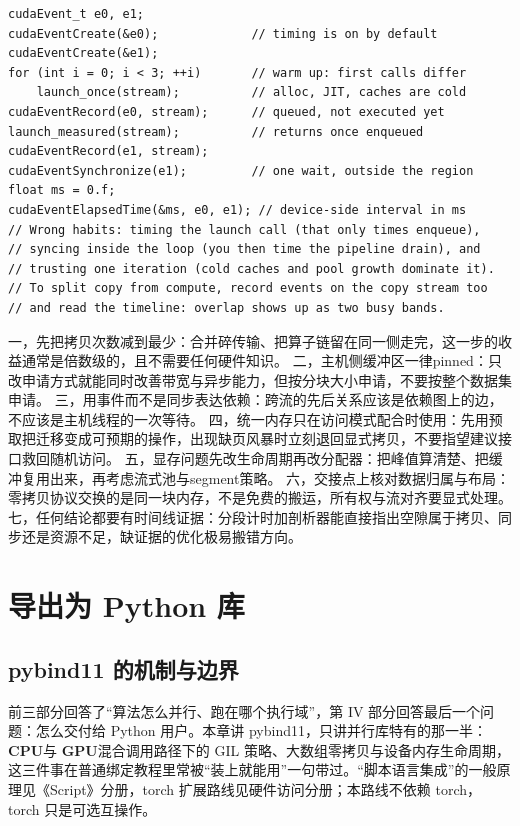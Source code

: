 \documentclass[12pt,a4paper,fontset=fandol]{ctexbook}
\newcommand{\Dom}[1]{\textsf{\bfseries #1}}
\newcommand{\CPU}{\Dom{CPU}}
\newcommand{\GPU}{\Dom{GPU}}
\begin{document}
\begin{lstlisting}[style=cudastyle,caption={事件计时的正确姿势}]
cudaEvent_t e0, e1;
cudaEventCreate(&e0);             // timing is on by default
cudaEventCreate(&e1);
for (int i = 0; i < 3; ++i)       // warm up: first calls differ
    launch_once(stream);          // alloc, JIT, caches are cold
cudaEventRecord(e0, stream);      // queued, not executed yet
launch_measured(stream);          // returns once enqueued
cudaEventRecord(e1, stream);
cudaEventSynchronize(e1);         // one wait, outside the region
float ms = 0.f;
cudaEventElapsedTime(&ms, e0, e1); // device-side interval in ms
// Wrong habits: timing the launch call (that only times enqueue),
// syncing inside the loop (you then time the pipeline drain), and
// trusting one iteration (cold caches and pool growth dominate it).
// To split copy from compute, record events on the copy stream too
// and read the timeline: overlap shows up as two busy bands.
\end{lstlisting}

\begin{bestpractice}[title={搬运层的落地顺序}]
一，先把拷贝次数减到最少：合并碎传输、把算子链留在同一侧走完，这一步的收益通常是倍数级的，且不需要任何硬件知识。
二，主机侧缓冲区一律pinned：只改申请方式就能同时改善带宽与异步能力，但按分块大小申请，不要按整个数据集申请。
三，用事件而不是同步表达依赖：跨流的先后关系应该是依赖图上的边，不应该是主机线程的一次等待。
四，统一内存只在访问模式配合时使用：先用预取把迁移变成可预期的操作，出现缺页风暴时立刻退回显式拷贝，不要指望建议接口救回随机访问。
五，显存问题先改生命周期再改分配器：把峰值算清楚、把缓冲复用出来，再考虑流式池与segment策略。
六，交接点上核对数据归属与布局：零拷贝协议交换的是同一块内存，不是免费的搬运，所有权与流对齐要显式处理。
七，任何结论都要有时间线证据：分段计时加剖析器能直接指出空隙属于拷贝、同步还是资源不足，缺证据的优化极易搬错方向。
\end{bestpractice}
\part{导出为 Python 库}

\chapter{pybind11 的机制与边界}

前三部分回答了``算法怎么并行、跑在哪个执行域''，第 IV 部分回答最后一个问题：怎么交付给 Python 用户。本章讲 pybind11，只讲并行库特有的那一半：\CPU{}与 \GPU{}混合调用路径下的 GIL 策略、大数组零拷贝与设备内存生命周期，这三件事在普通绑定教程里常被``装上就能用''一句带过。``脚本语言集成''的一般原理见《Script》分册，torch 扩展路线见硬件访问分册；本路线不依赖 torch，torch 只是可选互操作。
\end{document}
